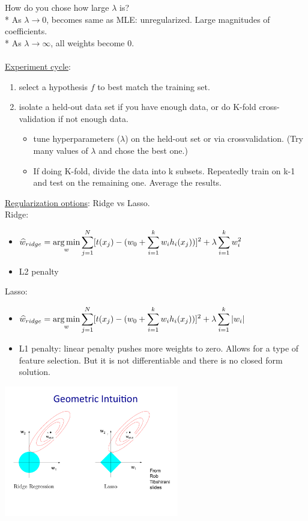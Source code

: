 How do you chose how large $\lambda$ is? \hfill \\
* As $\lambda \rightarrow 0$, becomes same as MLE: unregularized.  Large magnitudes of coefficients. \hfill \\
* As $\lambda \rightarrow \infty$, all weights become 0.  \hfill \\   \hfill \\

\underline{Experiment cycle}: 
\begin{enumerate}
	\item select a hypothesis $f$ to best match the training set. 
	\item isolate a held-out data set if you have enough data, or do K-fold cross-validation if not enough data. 
	\begin{itemize}
		\item tune hyperparameters ($\lambda$) on the held-out set or via crossvalidation.  (Try many values of $\lambda$ and chose the best one.)  
		\item If doing K-fold, divide the data into k subsets.  
				Repeatedly train on k-1 and test on the remaining one.  
				Average the results. 
	\end{itemize}
\end{enumerate}

\underline{Regularization options}: Ridge vs Lasso.  \hfill \\
Ridge: 
\begin{itemize}
	\item $ \displaystyle \widehat{w}_{ridge} = \operatorname*{arg\,min}_w \sum_{j=1}^N [t(x_j) - (w_0 + \sum_{i=1}^k w_i h_i(x_j))]^2 + \lambda \sum_{i=1}^k w_i^2   $ 
	\item L2 penalty   
\end{itemize}
Lasso: \hfill \\
\begin{itemize}
	\item$ \displaystyle \widehat{w}_{ridge} = \operatorname*{arg\,min}_w \sum_{j=1}^N [t(x_j) - (w_0 + \sum_{i=1}^k w_i h_i(x_j))]^2 + \lambda \sum_{i=1}^k |w_i|   $ 
	\item L1 penalty: linear penalty pushes more weights to zero.  Allows for a type of feature selection.  But it is not differentiable and there is no closed form solution. 
\end{itemize}

\includegraphics[width=3in]{figures/lasso_and_ridge_geometry.pdf}

